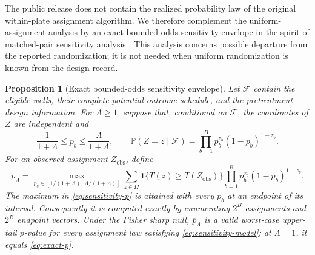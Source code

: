 \documentclass[11pt]{article}
\newtheorem{proposition}[theorem]{Proposition}
\theoremstyle{definition}
\theoremstyle{remark}
\newcommand{\bP}{\mathbb P}
\newcommand{\1}{\mathbf 1}
\begin{document}
The public release does not contain the realized probability law of the
original within-plate assignment algorithm.  We therefore complement the
uniform-assignment analysis by an exact bounded-odds sensitivity envelope in
the spirit of matched-pair sensitivity analysis \citep{rosenbaum1987sensitivity}.
This analysis concerns possible departure from the reported randomization; it
is not needed when uniform randomization is known from the design record.

\begin{proposition}[Exact bounded-odds sensitivity envelope]
\label{prop:sensitivity}
Let \(\mathcal F\) contain the eligible wells, their complete potential-outcome
schedule, and the pretreatment design information.  For \(\Lambda\ge1\),
suppose that, conditional on \(\mathcal F\), the coordinates of \(Z\) are
independent and
\begin{equation}\label{eq:sensitivity-model}
 \frac{1}{1+\Lambda}\le p_b\le\frac{\Lambda}{1+\Lambda},
 \qquad
 \bP(Z=z\mid\mathcal F)
 =\prod_{b=1}^B p_b^{z_b}(1-p_b)^{1-z_b}.
\end{equation}
For an observed assignment \(Z_{\mathrm{obs}}\), define
\begin{equation}\label{eq:sensitivity-p}
 \overline p_\Lambda
 =
 \max_{p_b\in[1/(1+\Lambda),\,\Lambda/(1+\Lambda)]}
 \sum_{z\in\Omega}
 \1\{T(z)\ge T(Z_{\mathrm{obs}})\}
 \prod_{b=1}^B p_b^{z_b}(1-p_b)^{1-z_b}.
\end{equation}
The maximum in \eqref{eq:sensitivity-p} is attained with every \(p_b\) at an
endpoint of its interval.  Consequently it is computed exactly by enumerating
\(2^B\) assignments and \(2^B\) endpoint vectors.  Under the Fisher sharp null,
\(\overline p_\Lambda\) is a valid worst-case upper-tail \(p\)-value for every
assignment law satisfying \eqref{eq:sensitivity-model}; at \(\Lambda=1\), it
equals \eqref{eq:exact-p}.
\end{proposition}
\end{document}
